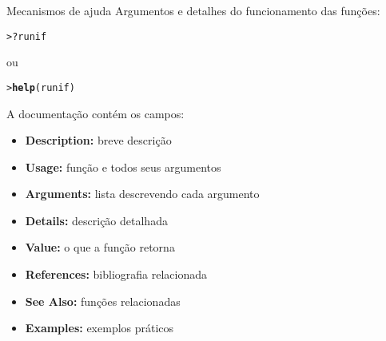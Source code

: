\documentclass[10pt,handout]{beamer}\usepackage{graphicx, color}
\makeatletter
\newcommand{\hlfunctioncall}[1]{\textcolor[rgb]{0,0,0.545098039215686}{\textbf{#1}}}%
\newenvironment{kframe}{%
 \def\at@end@of@kframe{}%
 \ifinner\ifhmode%
  \def\at@end@of@kframe{\end{minipage}}%
  \begin{minipage}{\columnwidth}%
 \fi\fi%
 \def\FrameCommand##1{\hskip\@totalleftmargin \hskip-\fboxsep
 \colorbox{shadecolor}{##1}\hskip-\fboxsep
     \hskip-\linewidth \hskip-\@totalleftmargin \hskip\columnwidth}%
 \MakeFramed {\advance\hsize-\width
   \@totalleftmargin\z@ \linewidth\hsize
   \@setminipage}}%
 {\par\unskip\endMakeFramed%
 \at@end@of@kframe}
\newenvironment{knitrout}{}{} %
\makeatother
\begin{document}
\begin{frame}[fragile=singleslide]{Mecanismos de ajuda}
Argumentos e detalhes do funcionamento das funções:
\begin{knitrout}\small
{}\color{fgcolor}\begin{kframe}
\begin{alltt}
> ?runif
\end{alltt}
\end{kframe}
\end{knitrout}

ou
\begin{knitrout}\small
{}\color{fgcolor}\begin{kframe}
\begin{alltt}
> \hlfunctioncall{help}(runif)
\end{alltt}
\end{kframe}
\end{knitrout}

A documentação contém os campos:
\begin{itemize}
\item \textbf{Description:} breve descrição
\item \textbf{Usage:} função e todos seus argumentos
\item \textbf{Arguments:} lista descrevendo cada argumento
\item \textbf{Details:} descrição detalhada
\item \textbf{Value:} o que a função retorna
\item \textbf{References:} bibliografia relacionada
\item \textbf{See Also:} funções relacionadas
\item \textbf{Examples:} exemplos práticos
\end{itemize}
\end{frame}
\end{document}
